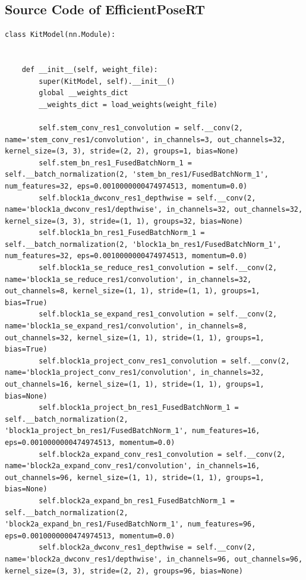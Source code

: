 \documentclass{fisatprojectfinal}
\begin{document}
\begin{appendices}
\section{Source Code of EfficientPoseRT}
	\begin{lstlisting}
class KitModel(nn.Module):

    
    def __init__(self, weight_file):
        super(KitModel, self).__init__()
        global __weights_dict
        __weights_dict = load_weights(weight_file)

        self.stem_conv_res1_convolution = self.__conv(2, name='stem_conv_res1/convolution', in_channels=3, out_channels=32, kernel_size=(3, 3), stride=(2, 2), groups=1, bias=None)
        self.stem_bn_res1_FusedBatchNorm_1 = self.__batch_normalization(2, 'stem_bn_res1/FusedBatchNorm_1', num_features=32, eps=0.0010000000474974513, momentum=0.0)
        self.block1a_dwconv_res1_depthwise = self.__conv(2, name='block1a_dwconv_res1/depthwise', in_channels=32, out_channels=32, kernel_size=(3, 3), stride=(1, 1), groups=32, bias=None)
        self.block1a_bn_res1_FusedBatchNorm_1 = self.__batch_normalization(2, 'block1a_bn_res1/FusedBatchNorm_1', num_features=32, eps=0.0010000000474974513, momentum=0.0)
        self.block1a_se_reduce_res1_convolution = self.__conv(2, name='block1a_se_reduce_res1/convolution', in_channels=32, out_channels=8, kernel_size=(1, 1), stride=(1, 1), groups=1, bias=True)
        self.block1a_se_expand_res1_convolution = self.__conv(2, name='block1a_se_expand_res1/convolution', in_channels=8, out_channels=32, kernel_size=(1, 1), stride=(1, 1), groups=1, bias=True)
        self.block1a_project_conv_res1_convolution = self.__conv(2, name='block1a_project_conv_res1/convolution', in_channels=32, out_channels=16, kernel_size=(1, 1), stride=(1, 1), groups=1, bias=None)
        self.block1a_project_bn_res1_FusedBatchNorm_1 = self.__batch_normalization(2, 'block1a_project_bn_res1/FusedBatchNorm_1', num_features=16, eps=0.0010000000474974513, momentum=0.0)
        self.block2a_expand_conv_res1_convolution = self.__conv(2, name='block2a_expand_conv_res1/convolution', in_channels=16, out_channels=96, kernel_size=(1, 1), stride=(1, 1), groups=1, bias=None)
        self.block2a_expand_bn_res1_FusedBatchNorm_1 = self.__batch_normalization(2, 'block2a_expand_bn_res1/FusedBatchNorm_1', num_features=96, eps=0.0010000000474974513, momentum=0.0)
        self.block2a_dwconv_res1_depthwise = self.__conv(2, name='block2a_dwconv_res1/depthwise', in_channels=96, out_channels=96, kernel_size=(3, 3), stride=(2, 2), groups=96, bias=None)

\end{lstlisting}
\end{appendices}
\end{document}
